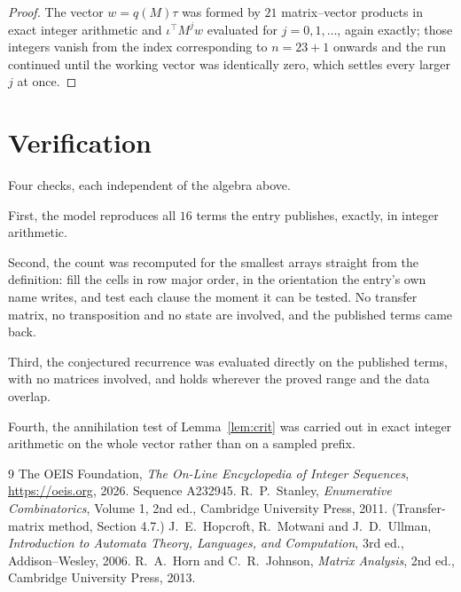 \documentclass[11pt,a4paper]{article}
\theoremstyle{plain}
\theoremstyle{definition}
\begin{document}
\begin{proof}
The vector $w=q(M)\tau$ was formed by $21$ matrix--vector products in exact integer
arithmetic and $\iota^{\!\top}M^{j}w$ evaluated for $j=0,1,\dots$, again exactly; those
integers vanish from the index corresponding to $n=23+1$ onwards and the run continued
until the working vector was identically zero, which settles every larger $j$ at once.
\end{proof}

\section{Verification}

Four checks, each independent of the algebra above.

First, the model reproduces all $16$ terms the entry publishes, exactly, in integer
arithmetic.

Second, the count was recomputed for the smallest arrays straight from the definition: fill the
cells in row major order, in the orientation the entry's own name writes, and test each clause
the moment it can be tested. No transfer matrix, no transposition and no state are involved,
and the published terms came back.

Third, the conjectured recurrence was evaluated directly on the published terms, with no
matrices involved, and holds wherever the proved range and the data overlap.

Fourth, the annihilation test of Lemma~\ref{lem:crit} was carried out in exact integer
arithmetic on the whole vector rather than on a sampled prefix.

\begin{thebibliography}{9}
 The OEIS Foundation, \emph{The On-Line Encyclopedia of Integer
Sequences}, \url{https://oeis.org}, 2026. Sequence A232945.
 R.~P.~Stanley, \emph{Enumerative Combinatorics}, Volume 1, 2nd ed.,
Cambridge University Press, 2011. (Transfer-matrix method, Section 4.7.)
 J.~E.~Hopcroft, R.~Motwani and J.~D.~Ullman, \emph{Introduction to Automata
Theory, Languages, and Computation}, 3rd ed., Addison--Wesley, 2006.
 R.~A.~Horn and C.~R.~Johnson, \emph{Matrix Analysis}, 2nd ed., Cambridge
University Press, 2013.
\end{thebibliography}
\end{document}
